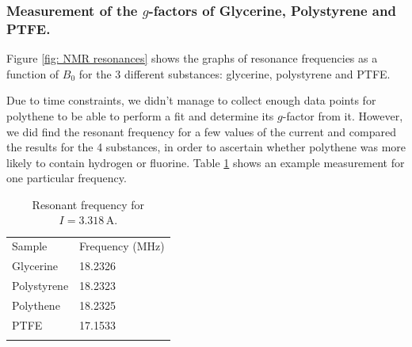 \documentclass[a4paper]{jpconf}
\numberwithin{equation}{section}
\begin{document}

\subsubsection{Measurement of the $g$-factors of Glycerine, Polystyrene and PTFE.}

Figure \ref{fig: NMR resonances} shows the graphs of resonance frequencies as a function of $B_0$ for the 3 different substances: glycerine, polystyrene and PTFE.

Due to time constraints, we didn't manage to collect enough data points for polythene to be able to perform a fit and determine its $g$-factor from it. However, we did find the resonant frequency for a few values of the current and compared the results for the 4 substances, in order to ascertain whether polythene was more likely to contain hydrogen or fluorine. Table \ref{table: polythene} shows an example measurement for one particular frequency.

\begin{table}
	\caption{\label{table: polythene} Resonant frequency for $I = 3.318 \, \si{\ampere}$.}
	\begin{center}
		\begin{tabular}{ll}
			\br
			Sample&Frequency ($\si{\mega\hertz}$)\\
			\mr
			Glycerine&18.2326\\
			Polystyrene&18.2323\\
			Polythene&18.2325\\
			PTFE&17.1533\\
			\br
		\end{tabular}
	\end{center}
\end{table}
\end{document}
